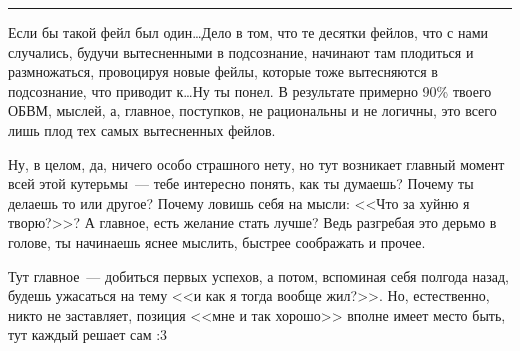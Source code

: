 \documentclass[a4paper,14pt,oneside]{memoir}
\begin{document}
\clearpage

\fancybreak{* * *}

\medskip


\medskip

Если бы такой фейл был один\ldots Дело в том, что те десятки фейлов, что с нами случались, будучи вытесненными в подсознание, начинают там плодиться и размножаться, провоцируя новые фейлы, которые тоже вытесняются в подсознание, что приводит к\ldots Ну ты понел. В результате примерно 90\% твоего ОБВМ, мыслей, а, главное, поступков, не рациональны и не логичны, это всего лишь плод тех самых вытесненных фейлов.
 
\medskip


\medskip

Ну, в целом, да, ничего особо страшного нету, но тут возникает главный момент всей этой кутерьмы~--- тебе интересно понять, как ты думаешь? Почему ты делаешь то или другое? Почему ловишь себя на мысли: <<Что за хуйню я творю?>>? А главное, есть желание стать лучше? Ведь разгребая это дерьмо в голове, ты начинаешь яснее мыслить, быстрее соображать и прочее.
 
Тут главное~--- добиться первых успехов, а потом, вспоминая себя полгода назад, будешь ужасаться на тему <<и как я тогда вообще жил?>>. Но, естественно, никто не заставляет, позиция <<мне и так хорошо>> вполне имеет место быть, тут каждый решает сам :3


\end{document}
